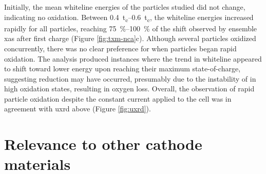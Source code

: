\documentclass{article}
\begin{document}
Initially, the mean whiteline energies of the particles studied did
not change, indicating no  oxidation. Between
\SIrange{0.4}{0.6}{t_c}, the whiteline energies increased rapidly for
all particles, reaching \SIrange{75}{100}{\percent} of the shift observed by ensemble \gls{xas} after first charge (Figure \ref{fig:txm-nca}c). Although several particles oxidized
concurrently, there was no clear preference for when particles began
rapid oxidation. The analysis produced instances where the trend in
whiteline appeared to shift toward lower energy upon reaching their
maximum state-of-charge, suggesting  reduction may have
occurred, presumably due to the instability of  in high
oxidation states\cite{myung2020-2}, resulting in oxygen loss. Overall,
the observation of rapid particle oxidation despite the constant
current applied to the cell was in agreement with \gls{uxrd} above
(Figure \ref{fig:uxrd}).


\newpage %
\section{Relevance to other cathode materials}

\end{document}
